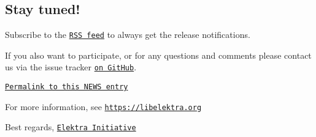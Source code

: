 \subsection*{Stay tuned!}

Subscribe to the \href{https://www.libelektra.org/news/feed.rss}{\tt R\+SS feed} to always get the release notifications.

If you also want to participate, or for any questions and comments please contact us via the issue tracker \href{http://issues.libelektra.org}{\tt on Git\+Hub}.

\href{https://www.libelektra.org/news/0.8.25-release}{\tt Permalink to this N\+E\+WS entry}

For more information, see \href{https://libelektra.org}{\tt https\+://libelektra.\+org}

Best regards, \href{https://www.libelektra.org/developers/authors}{\tt Elektra Initiative} 